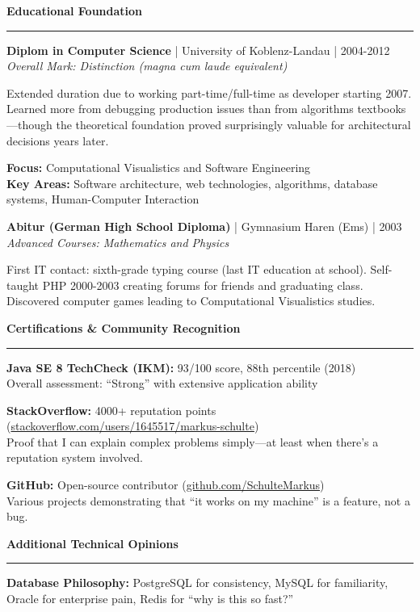 \documentclass[11pt,a4paper]{article}
\newcommand{\sectionheader}[1]{
    \vspace{0.4em}
    {\Large \textbf{\textsf{\textcolor{primarycolor}{#1}}}}
    \vspace{0.2em}
    \hrule
    \vspace{0.3em}
}
\begin{document}
\vfill

\newpage

\sectionheader{Educational Foundation}

\textbf{Diplom in Computer Science} | University of Koblenz-Landau | 2004-2012 \\
\textit{Overall Mark: Distinction (magna cum laude equivalent)}

Extended duration due to working part-time/full-time as developer starting 2007. Learned more from debugging production issues than from algorithms textbooks---though the theoretical foundation proved surprisingly valuable for architectural decisions years later.

\textbf{Focus:} Computational Visualistics and Software Engineering \\
\textbf{Key Areas:} Software architecture, web technologies, algorithms, database systems, Human-Computer Interaction

\textbf{Abitur (German High School Diploma)} | Gymnasium Haren (Ems) | 2003 \\
\textit{Advanced Courses: Mathematics and Physics}

First IT contact: sixth-grade typing course (last IT education at school). Self-taught PHP 2000-2003 creating forums for friends and graduating class. Discovered computer games leading to Computational Visualistics studies.

\sectionheader{Certifications \& Community Recognition}

\textbf{Java SE 8 TechCheck (IKM):} 93/100 score, 88th percentile (2018) \\
Overall assessment: ``Strong'' with extensive application ability

\textbf{StackOverflow:} 4000+ reputation points (\href{https://stackoverflow.com/users/1645517/markus-schulte}{stackoverflow.com/users/1645517/markus-schulte}) \\
Proof that I can explain complex problems simply---at least when there's a reputation system involved.

\textbf{GitHub:} Open-source contributor (\href{https://github.com/SchulteMarkus}{github.com/SchulteMarkus}) \\
Various projects demonstrating that ``it works on my machine'' is a feature, not a bug.

\sectionheader{Additional Technical Opinions}

\textbf{Database Philosophy:} PostgreSQL for consistency, MySQL for familiarity, Oracle for enterprise pain, Redis for ``why is this so fast?''
\end{document}
